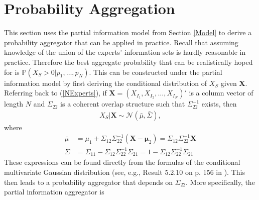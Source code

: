 \documentclass[11pt]{article}
\renewcommand{\P}{\mathbb{P}}
\theoremstyle{definition}
\theoremstyle{definition}
\begin{document}
%
%




\section{Probability Aggregation}
\label{aggregation}
This section uses the partial information model from Section \ref{Model} to derive a probability aggregator that can be applied in practice. Recall that assuming knowledge of the union of the experts' information sets is hardly reasonable in practice. Therefore the best aggregate probability that can be realistically hoped for is  $\P(X_{S} > 0 | p_1, \dots, p_N)$.  This can be constructed under the partial information model by first deriving the conditional distribution of $X_S$ given $\boldsymbol{X}$. Referring back to (\ref{NExperts}), if $\boldsymbol{X} = (X_{I_1}, X_{I_2},  \dots, X_{I_N})'$ is a column vector of length $N$ and $\Sigma_{22}$ is a coherent overlap structure such that $\Sigma_{22}^{-1}$ exists, then 
\begin{align*}
X_{S} | \boldsymbol{X} \sim \mathcal{N}\left(\bar{\mu}, \bar{\Sigma}\right), 
\end{align*}
where
\begin{align*}
\bar{\mu} &= \mu_1 + \Sigma_{12} \Sigma_{22}^{-1} (\boldsymbol{X} - \boldsymbol{\mu}_2) =  \Sigma_{12} \Sigma_{22}^{-1} \boldsymbol{X} \\
 \bar{\Sigma}&= \Sigma_{11} - \Sigma_{12} \Sigma_{22}^{-1} \Sigma_{21} =1 - \Sigma_{12} \Sigma_{22}^{-1} \Sigma_{21}  
\end{align*}
These expressions can be found directly from the formulas of the conditional multivariate Gaussian distribution (see, e.g., Result 5.2.10 on p. 156 in \citet{ravishanker2001first}). This then leads to a probability aggregator that depends on $\Sigma_{22}$. More specifically, the partial information aggregator is
\end{document}
